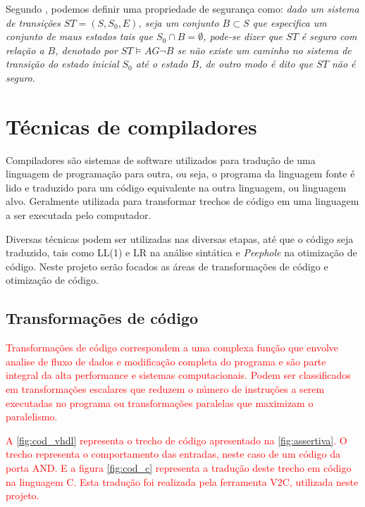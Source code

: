\par
Segundo \cite{clarke2003verification}, podemos definir uma propriedade de segurança como: \textit{dado um sistema de transições $ST = (S, S_0, E)$, seja um conjunto $B \subset S$ que especifica um conjunto de maus estados tais que $S_0 \cap B = \emptyset$, pode-se dizer que $ST$ é seguro com relação a $B$, denotado por $ST \models AG\neg B$ se não existe um caminho no sistema de transição do estado inicial $S_0$ até o estado $B$, de outro modo é dito que $ST$ não é seguro}.
\section{Técnicas de compiladores}
\par
Compiladores são sistemas de software utilizados para tradução de uma linguagem de programação para outra, ou seja, o programa da linguagem fonte é lido e traduzido para um código equivalente na outra linguagem, ou linguagem alvo. Geralmente utilizada para transformar trechos de código em uma linguagem a ser executada pelo computador\cite{aho2007compilers}. 

\par
Diversas técnicas podem ser utilizadas nas diversas etapas, até que o código seja traduzido, tais como LL(1) e LR na análise sintática e \textit{Peephole} na otimização de código\cite{aho2007compilers}. Neste projeto serão focados as áreas de transformações de código e otimização de código.
\subsection{Transformações de código}
\par
\textcolor{red}{Transformações de código correspondem a uma complexa função que envolve analise de fluxo de dados e modificação completa do programa e são parte integral da alta performance e sistemas computacionais. Podem ser classificados em transformações escalares que reduzem o número de instruções a serem executadas no programa ou transformações paralelas que maximizam o paralelismo.\cite{srikant2002compiler}}

\par
\textcolor{red}{A \autoref{fig:cod_vhdl} representa o trecho de código apresentado na \autoref{fig:assertiva}. O trecho representa o comportamento das entradas, neste caso de um código da porta AND. E a figura \autoref{fig:cod_c} representa a tradução deste trecho em código na linguagem C. Esta tradução foi realizada pela ferramenta V2C, utilizada neste projeto.}

